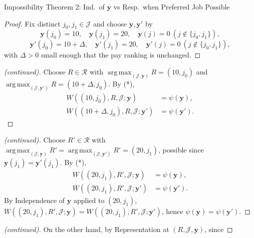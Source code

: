 \documentclass[10pt]{beamer}
\DeclareMathOperator*{\argmax}{arg\,max}
\begin{document}
\begin{frame}[allowframebreaks]{Impossibility Theorem 2: Ind.\ of $\mathbf y$ vs Resp.\ when Preferred Job Possible}
\begin{proof}
Fix distinct $j_0,j_1\in\mathcal J$ and choose $\mathbf y,\mathbf y'$ by
\begin{equation*}
\mathbf y(j_0)=10,\quad \mathbf y(j_1)=20,\quad \mathbf y(j)=0\ (j\notin\{j_0,j_1\}),
\end{equation*}
\begin{equation*}
\mathbf y'(j_0)=10+\Delta,\quad \mathbf y'(j_1)=20,\quad \mathbf y'(j)=0\ (j\notin\{j_0,j_1\}),
\end{equation*}
with $\Delta>0$ small enough that the pay ranking is unchanged.
\end{proof}
\framebreak
\begin{proof}[(continued)]
Choose $R\in\mathcal R$ with $\argmax_{(\mathcal J,\mathbf y)}R=(10,j_0)$ and
$\argmax_{(\mathcal J,\mathbf y')}R=(10+\Delta,j_0)$. By (*),
\begin{align*}
W((10,j_0),R,\mathcal J;\mathbf y)&=\psi(\mathbf y),\\
W((10+\Delta,j_0),R,\mathcal J;\mathbf y')&=\psi(\mathbf y').
\end{align*}
\end{proof}
\framebreak
\begin{proof}[(continued)]
Choose $R'\in\mathcal R$ with $\argmax_{(\mathcal
J,\mathbf y)}R'=\argmax_{(\mathcal J,\mathbf y')}R'=(20,j_1)$, possible since
$\mathbf y(j_1)=\mathbf y'(j_1)$. By (*),
\begin{align*}
W((20,j_1),R',\mathcal J;\mathbf y)&=\psi(\mathbf y),\\
W((20,j_1),R',\mathcal J;\mathbf y')&=\psi(\mathbf y').
\end{align*}
By Independence of $\mathbf y$ applied to $(20,j_1)$,
$W((20,j_1),R',\mathcal J;\mathbf y)=W((20,j_1),R',\mathcal J;\mathbf y')$, hence
$\psi(\mathbf y)=\psi(\mathbf y')$.
\end{proof}
\framebreak
\begin{proof}[(continued)]
On the other hand, by Representation at $(R,\mathcal J,\mathbf y)$, since

\end{proof}
\end{frame}
\end{document}
